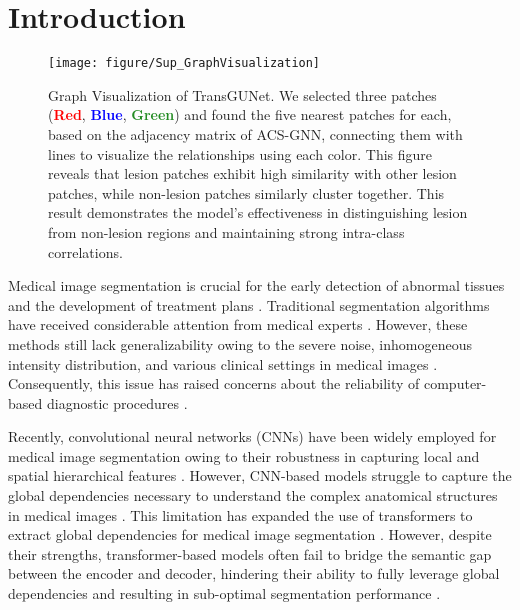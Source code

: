 \section{Introduction}
\label{sec:intro}

\begin{figure}[t]
    \centering
    \texttt{[image: figure/Sup\_GraphVisualization]}
        \caption{Graph Visualization of TransGUNet. We selected three patches (\textcolor{red}{\textbf{Red}}, \textcolor{blue}{\textbf{Blue}}, \textcolor{ForestGreen}{\textbf{Green}}) and found the five nearest patches for each, based on the adjacency matrix of ACS-GNN, connecting them with lines to visualize the relationships using each color. This figure reveals that lesion patches exhibit high similarity with other lesion patches, while non-lesion patches similarly cluster together. This result demonstrates the model’s effectiveness in distinguishing lesion from non-lesion regions and maintaining strong intra-class correlations.}
    \label{fig:GraphVisualization}
\end{figure}

Medical image segmentation is crucial for the early detection of abnormal tissues and the development of treatment plans \cite{coates2015tailoring}. Traditional segmentation algorithms have received  considerable attention from medical experts \cite{otsu1979threshold, haralick1987image, kass1988snakes, tizhoosh2005image}. However, these methods still lack generalizability owing to the severe noise, inhomogeneous intensity distribution, and various clinical settings in medical images \cite{riccio2018new}. Consequently, this issue has raised concerns about the reliability of computer-based diagnostic procedures \cite{gaube2021ai}.

Recently, convolutional neural networks (CNNs) have been widely employed for medical image segmentation owing to their robustness in capturing local and spatial hierarchical features \cite{ronneberger2015u, zhao2021automatic, nam2023m3fpolypsegnet}. However, CNN-based models struggle to capture the global dependencies necessary to understand the complex anatomical structures in medical images \cite{hatamizadeh2022unetr}. This limitation has expanded the use of transformers to extract global dependencies for medical image segmentation \cite{chen2021transunet, cao2022swin}. However, despite their strengths, transformer-based models often fail to bridge the semantic gap between the encoder and decoder, hindering their ability to fully leverage global dependencies and resulting in sub-optimal segmentation performance \cite{wang2022uctransnet}.

